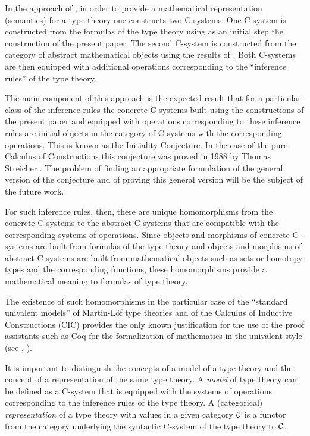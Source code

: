 \documentclass[11pt]{article}
\begin{document}
In the approach of \cite{CMUtalk}, in order to provide a mathematical representation (semantics) for a type theory one constructs two C-systems. One C-system is constructed from the formulas of the type theory using as an initial step the construction of the present paper.  The second C-system is constructed from the category of abstract mathematical objects using the results of \cite{Cfromauniverse}. Both C-systems are then equipped with additional operations corresponding to the ``inference rules'' of the type theory. 

The main component of this approach is the expected result that for a particular class of the inference rules the concrete C-systems built using the constructions of the present paper and equipped with operations corresponding to these inference rules are initial objects in the category of C-systems with the corresponding operations. This is known as the Initiality Conjecture. In the case of the pure Calculus of Constructions this conjecture was proved in 1988 by Thomas Streicher \cite{Streicher}. The problem of finding an appropriate formulation of the general version of the conjecture and of proving this general version will be the subject of the future work. 

For such inference rules, then, there are unique homomorphisms from the concrete C-systems to the abstract C-systems that are compatible with the corresponding systems of operations. Since objects and morphisms of concrete C-systems are built from formulas of the type theory and objects and morphisms of abstract C-systems are built from mathematical objects such as sets or homotopy types and the corresponding functions, these homomorphisms provide a mathematical meaning to formulas of type theory. 

The existence of such homomorphisms in the particular case of the ``standard univalent models'' of  Martin-L\"{o}f type theories and of the Calculus of Inductive Constructions (CIC) provides the only known justification for the use of the proof assistants such as Coq for the formalization of mathematics in the univalent style (see \cite{UniMath}, \cite{UniMath2015}). 

It is important to distinguish the concepts of a model of a type theory and the concept of a representation of the same type theory. A {\em model} of type theory can be defined as a C-system that is equipped with the systems of operations corresponding to the inference rules of the type theory. A (categorical) {\em representation} of a type theory with values in a given category $\cal C$ is a functor from the category underlying the syntactic C-system of the type theory to $\cal C$. 
\end{document}
